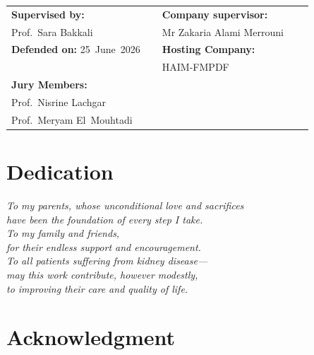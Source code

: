 \documentclass[12pt,a4paper,twoside]{report}
\begin{document}
\begin{titlepage}
\begin{center}
\begin{tabular}{p{0.46\linewidth}p{0.46\linewidth}}
  \textbf{Supervised by:}   & \textbf{Company supervisor:}\\[0.25cm]
  Prof.\ Sara Bakkali        & Mr Zakaria Alami Merrouni  \\[0.7cm]
  \textbf{Defended on:} 25~June~2026 &\textbf{Hosting Company:}\\[0.25cm]
                             & HAIM-FMPDF                 \\[0.7cm]
  \textbf{Jury Members:}    &                            \\[0.3cm]
  Prof.\ Nisrine Lachgar     &                            \\[0.15cm]
  Prof.\ Meryam El~Mouhtadi  &                            \\
\end{tabular}

\end{center}
\end{titlepage}

\chapter*{Dedication}
\thispagestyle{empty}
\vspace*{4cm}
\begin{flushright}
\itshape
To my parents, whose unconditional love and sacrifices\\
have been the foundation of every step I take.\\[0.8cm]
To my family and friends,\\
for their endless support and encouragement.\\[0.8cm]
To all patients suffering from kidney disease—\\
may this work contribute, however modestly,\\
to improving their care and quality of life.
\end{flushright}

\chapter*{Acknowledgment}
\thispagestyle{empty}
\end{document}
